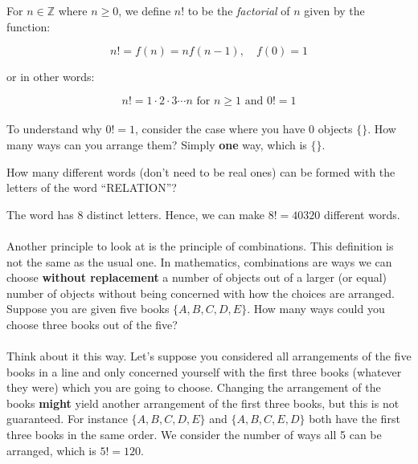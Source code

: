\documentclass[12pt, a4paper, titlepage, twoside]{article}
\newcommand*{\Z}{\mathbb{Z}}
\newcounter{excount}[subsection]
\begin{document}
	\begin{kp}
		For $n \in \Z$ where $n \geq 0$, we define $n!$ to be the \textit{factorial} of $n$ given by the function:
		
		\[n! = f(n) = n f(n-1), \quad f(0) = 1\]
		
		or in other words:
		
		\[n! = 1 \cdot 2 \cdot 3 \cdots n \text{ for } n \geq 1 \text{ and } 0! = 1\]
	\end{kp}
	
	\paragraph{}
	To understand why $0! = 1$, consider the case where you have 0 objects $\{\}$. How many ways can you arrange them? Simply
	\textbf{one} way, which is $\{\}$.\\
	
	\begin{ex}
		How many different words (don't need to be real ones) can be formed with the letters of the word ``RELATION''?
		
		\hfill
		\tcbline
		\hfill
		
		The word has 8 distinct letters. Hence, we can make $8! = \num{40 320}$ different words.
	\end{ex}
	
	\paragraph{}
	Another principle to look at is the principle of combinations. This definition is not the same as the usual one. In mathematics, 
	combinations are ways we can choose \textbf{without replacement} a number of objects out of a larger (or equal) number of 
	objects without being concerned with how the choices are arranged. Suppose you are given five books $\{A,B,C,D,E\}$. How 
	many ways could you choose three books out of the five?
	
	\paragraph{}
	Think about it this way. Let's suppose you considered all arrangements of the five books in a line and only concerned yourself with the
	first three books (whatever they were) which you are going to choose. Changing the arrangement of the books \textbf{might} yield 
	another arrangement of the first three books, but this is not guaranteed. For instance $\{A,B,C,D,E\}$ and $\{A,B,C,E,D\}$ both have 
	the first three books in the same order. We consider the number of ways all 5 can be arranged, which is $5! = 120$.
	
\end{document}
